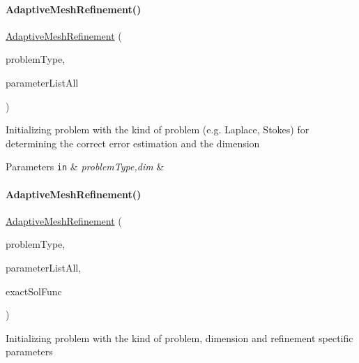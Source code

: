 \paragraph{\texorpdfstring{Adaptive\+Mesh\+Refinement()}{AdaptiveMeshRefinement()}\hspace{0.1cm}{\footnotesize\ttfamily [1/2]}}
{\footnotesize\ttfamily \hyperlink{classFEDD_1_1AdaptiveMeshRefinement}{Adaptive\+Mesh\+Refinement} (\begin{DoxyParamCaption}\item[{string}]{problem\+Type,  }\item[{Parameter\+List\+Ptr\+\_\+\+Type}]{parameter\+List\+All }\end{DoxyParamCaption})}

Initializing problem with the kind of problem (e.\+g. Laplace, Stokes) for determining the correct error estimation and the dimension 
\begin{DoxyParams}[1]{Parameters}
\mbox{\tt in}  & {\em problem\+Type,dim} & \\
\hline
\end{DoxyParams}
\mbox{\label{classFEDD_1_1AdaptiveMeshRefinement_ad5f475f6ca3eb55635d9838b1c641ca8}} 
\paragraph{\texorpdfstring{Adaptive\+Mesh\+Refinement()}{AdaptiveMeshRefinement()}\hspace{0.1cm}{\footnotesize\ttfamily [2/2]}}
{\footnotesize\ttfamily \hyperlink{classFEDD_1_1AdaptiveMeshRefinement}{Adaptive\+Mesh\+Refinement} (\begin{DoxyParamCaption}\item[{string}]{problem\+Type,  }\item[{Parameter\+List\+Ptr\+\_\+\+Type}]{parameter\+List\+All,  }\item[{Func\+\_\+\+Type}]{exact\+Sol\+Func }\end{DoxyParamCaption})}

Initializing problem with the kind of problem, dimension and refinement spectific parameters 

